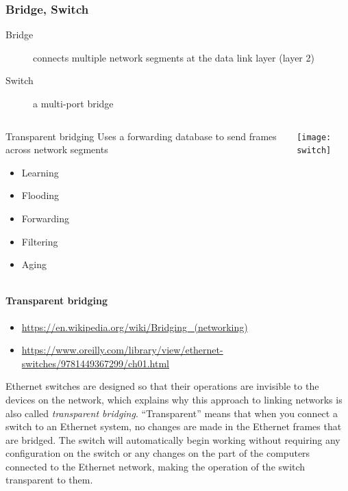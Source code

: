 \subsubsection{Bridge, Switch}

\begin{frame}
  \begin{description}
  \item[Bridge] connects multiple network segments at the data link layer (layer 2)
  \item[Switch] a multi-port bridge
  \end{description}
  \begin{columns}[b]
    \begin{column}{.45\linewidth}
      \begin{iblock}{Transparent bridging}
        Uses a forwarding database to send frames across network segments
        \begin{itemize}
        \item Learning
        \item Flooding
        \item Forwarding
        \item Filtering
        \item Aging
        \end{itemize}
      \end{iblock}
    \end{column}
    \begin{column}{.55\linewidth}
      \texttt{[image: switch]}
    \end{column}
  \end{columns}
\end{frame}

\paragraph{Transparent bridging}

\begin{itemize}
\item \url{https://en.wikipedia.org/wiki/Bridging_(networking)}
\item \url{https://www.oreilly.com/library/view/ethernet-switches/9781449367299/ch01.html}
\end{itemize}

Ethernet switches are designed so that their operations are invisible to the devices on
the network, which explains why this approach to linking networks is also called
\emph{transparent bridging}. “Transparent” means that when you connect a switch to an Ethernet
system, no changes are made in the Ethernet frames that are bridged. The switch will
automatically begin working without requiring any configuration on the switch or any
changes on the part of the computers connected to the Ethernet network, making the
operation of the switch transparent to them.

